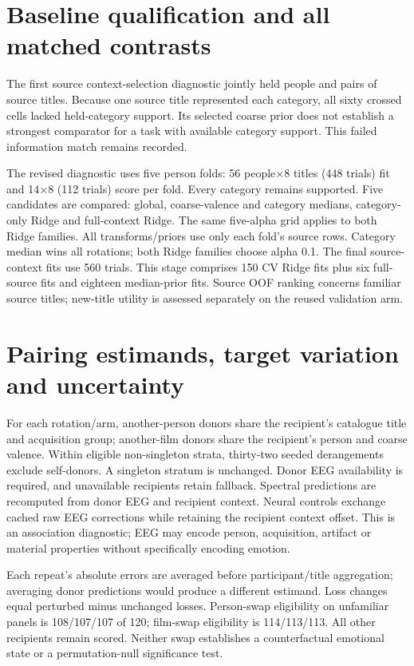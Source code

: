 \documentclass[10pt,a4paper]{article}
\begin{document}
\section{Baseline qualification and all matched contrasts}
The first source context-selection diagnostic jointly held people and pairs of source titles. Because one source title represented each category, all sixty crossed cells lacked held-category support. Its selected coarse prior does not establish a strongest comparator for a task with available category support. This failed information match remains recorded.

The revised diagnostic uses five person folds: 56 people\(\times\)8 titles (448 trials) fit and 14\(\times\)8 (112 trials) score per fold. Every category remains supported. Five candidates are compared: global, coarse-valence and category medians, category-only Ridge and full-context Ridge. The same five-alpha grid applies to both Ridge families. All transforms/priors use only each fold's source rows. Category median wins all rotations; both Ridge families choose alpha 0.1. The final source-context fits use 560 trials. This stage comprises 150 CV Ridge fits plus six full-source fits and eighteen median-prior fits. Source OOF ranking concerns familiar source titles; new-title utility is assessed separately on the reused validation arm.

\section{Pairing estimands, target variation and uncertainty}
For each rotation/arm, another-person donors share the recipient's catalogue title and acquisition group; another-film donors share the recipient's person and coarse valence. Within eligible non-singleton strata, thirty-two seeded derangements exclude self-donors. A singleton stratum is unchanged. Donor EEG availability is required, and unavailable recipients retain fallback. Spectral predictions are recomputed from donor EEG and recipient context. Neural controls exchange cached raw EEG corrections while retaining the recipient context offset. This is an association diagnostic; EEG may encode person, acquisition, artifact or material properties without specifically encoding emotion.

Each repeat's absolute errors are averaged before participant/title aggregation; averaging donor predictions would produce a different estimand. Loss changes equal perturbed minus unchanged losses. Person-swap eligibility on unfamiliar panels is 108/107/107 of 120; film-swap eligibility is 114/113/113. All other recipients remain scored. Neither swap establishes a counterfactual emotional state or a permutation-null significance test.
\end{document}

